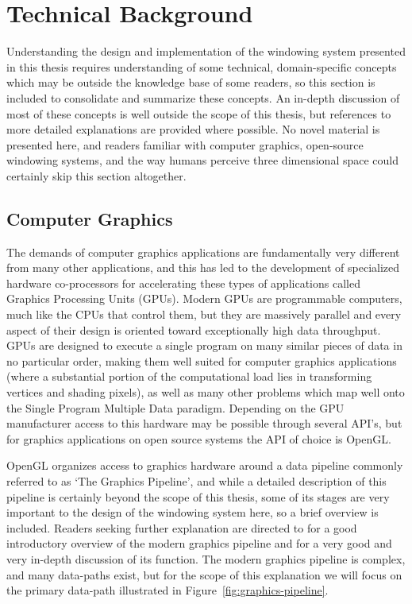 \chapter{Technical Background}
\label{sec:tech-background}
Understanding the design and implementation of the windowing system presented in this thesis requires understanding of some technical, domain-specific concepts which may be outside the knowledge base of some readers, so this section is included to consolidate and summarize these concepts. An in-depth discussion of most of these concepts is well outside the scope of this thesis, but references to more detailed explanations are provided where possible. No novel material is presented here, and readers familiar with computer graphics, open-source windowing systems, and the way humans perceive three dimensional space could certainly skip this section altogether.

\section{Computer Graphics}
\label{sec:graphics-pipeline}
The demands of computer graphics applications are fundamentally very different from many other applications, and this has led to the development of specialized hardware co-processors for accelerating these types of applications called Graphics Processing Units (GPUs). Modern GPUs are programmable computers, much like the CPUs that control them, but they are massively parallel and every aspect of their design is oriented toward exceptionally high data throughput. GPUs are designed to execute a single program on many similar pieces of data in no particular order, making them well suited for computer graphics applications (where a substantial portion of the computational load lies in transforming vertices and shading pixels), as well as many other problems which map well onto the Single Program Multiple Data paradigm. Depending on the GPU manufacturer access to this hardware may be possible through several API's, but for graphics applications on open source systems the API of choice is OpenGL.
		
OpenGL organizes access to graphics hardware around a data pipeline commonly referred to as `The Graphics Pipeline', and while a detailed description of this pipeline is certainly beyond the scope of this thesis, some of its stages are very important to the design of the windowing system here, so a brief overview is included. Readers seeking further explanation are directed to \cite{graphics-intro} for a good introductory overview of the modern graphics pipeline and \cite{trip-through-pipeline} for a very good and very in-depth discussion of its function. The modern graphics pipeline is complex, and many data-paths exist, but for the scope of this explanation we will focus on the primary data-path illustrated in Figure~\ref{fig:graphics-pipeline}.

